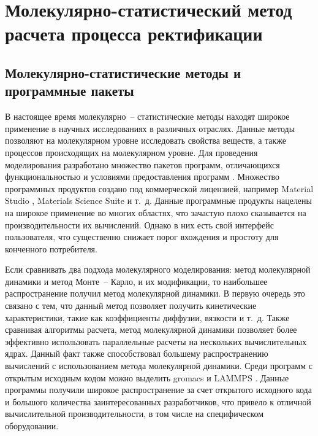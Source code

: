 \section{Молекулярно-статистический метод расчета процесса ректификации}



\subsection{Молекулярно-статистические методы и программные пакеты}

В настоящее время молекулярно~-- статистические методы находят широкое применение в научных исследованиях в различных отраслях. Данные методы позволяют на молекулярном уровне исследовать свойства веществ, а также процессов происходящих на молекулярном уровне. Для проведения моделирования разработано множество пакетов программ, отличающихся функциональностью и условиями предоставления программ \cite{wiki_progs}. Множество программных продуктов создано под коммерческой лицензией, например Material Studio \cite{material_studio} , Materials Science Suite \cite{shedinger} и т.~д. Данные программные продукты нацелены на широкое применение во многих областях, что зачастую плохо сказывается на производительности их вычислений. Однако в них есть свой интерфейс пользователя, что существенно снижает порог вхождения и простоту для конченного потребителя.

Если сравнивать два подхода молекулярного моделирования: метод молекулярной динамики и метод Монте~-- Карло, и их модификации, то наибольшее распространение получил метод молекулярной динамики. В первую очередь это связано с тем, что данный метод позволяет получить кинетические характеристики, такие как коэффициенты диффузии, вязкости и т.~д. Также сравнивая алгоритмы расчета, метод молекулярной динамики позволяет более эффективно использовать параллельные расчеты на нескольких вычислительных ядрах. Данный факт также способствовал большему распространению вычислений с использованием метода молекулярной динамики. Среди программ с открытым исходным кодом можно выделить gromacs \cite{Berendsen1995,Pronk2013,Abraham2015} и LAMMPS \cite{Plimpton1995,Thompson2009} . Данные программы получили широкое распространение за счет открытого исходного кода и большого количества заинтересованных разработчиков, что привело к отличной вычислительной производительности, в том числе на специфическом оборудовании. 

